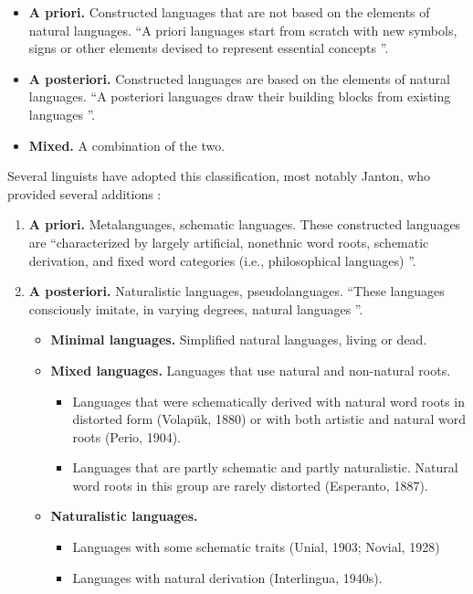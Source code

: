 \documentclass[14pt, a4paper]{extreport}
\begin{document}
\begin{itemize}
  \item \textbf{A priori.} Constructed languages that are not based on the elements of natural languages. ``A priori languages start from scratch with new symbols, signs or other elements devised to represent essential concepts \parencite{bianco}''.
  \item \textbf{A posteriori.} Constructed languages are based on the elements of natural languages. ``A posteriori languages draw their building blocks from existing languages  \parencite{bianco}''.
  \item \textbf{Mixed.} A combination of the two.
\end{itemize}

Several linguists have adopted this classification, most notably Janton, who provided several additions \parencite[5]{janton}:

\begin{enumerate}
  \item \textbf{A priori.} Metalanguages, schematic languages. These constructed languages are ``characterized by largely artificial, nonethnic word roots, schematic derivation, and fixed word categories (i.e., philosophical languages) \parencite[6]{janton}''.
  \item \textbf{A posteriori.} Naturalistic languages, pseudolanguages. ``These languages consciously imitate, in varying degrees, natural languages \parencite[5]{janton}''.
  \begin{itemize}
    \item \textbf{Minimal languages.} Simplified natural languages, living or dead.
    \item \textbf{Mixed languages.} Languages that use natural and non-natural roots.
      \begin{itemize}
        \item Languages that were schematically derived with natural word roots in distorted form (Volapük, 1880) or with both artistic and natural word roots (Perio, 1904).
        \item Languages that are partly schematic and partly naturalistic. Natural word roots in this group are rarely distorted (Esperanto, 1887).
      \end{itemize}
  \item \textbf{Naturalistic languages.}
    \begin{itemize}
      \item Languages with some schematic traits (Unial, 1903; Novial, 1928)
      \item Languages with natural derivation (Interlingua, 1940s).
    \end{itemize}
  \end{itemize}
\end{enumerate}
\end{document}
